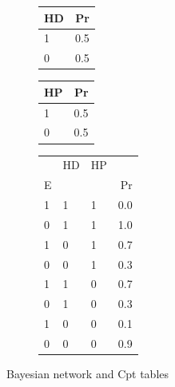 \documentclass[
  10pt,
  dvipsnames,enabledeprecatedfontcommands]{scrartcl}
\begin{document}
\begin{figure}
\hspace{1cm} \hfill
\hspace{-3cm}\begin{subfigure}[!ht]{0.6\textwidth}

\begin{tabular}{lr}
\toprule
HD & Pr\\
\midrule
1 & 0.5\\
0 & 0.5\\
\bottomrule
\end{tabular}


\begin{tabular}{lr}
\toprule
HP & Pr\\
\midrule
1 & 0.5\\
0 & 0.5\\
\bottomrule
\end{tabular}


\begin{tabular}{lllr}
\toprule
\multicolumn{1}{c}{} & \multicolumn{1}{c}{HD} & \multicolumn{1}{c}{HP} & \multicolumn{1}{c}{} \\
E &  &  & Pr\\
\midrule
1 & 1 & 1 & 0.0\\
0 & 1 & 1 & 1.0\\
1 & 0 & 1 & 0.7\\
0 & 0 & 1 & 0.3\\
1 & 1 & 0 & 0.7\\
0 & 1 & 0 & 0.3\\
1 & 0 & 0 & 0.1\\
0 & 0 & 0 & 0.9\\
\bottomrule
\end{tabular}
\end{subfigure}
\caption{Bayesian network and \textsf{Cpt} tables}
\label{fig:Cpt}
\end{figure}
\end{document}
